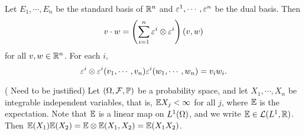 \begin{example}
    Let $E_1, \cdots, E_n$ be the standard basis of $\mathbb{R}^n$ and $\varepsilon^1, \cdots, \varepsilon^n$ be the dual basis. Then 
    $$ v \cdot w = \left(\sum_{i=1}^{n}\varepsilon^i \otimes \varepsilon^i\right)(v,w) $$ for all $v,w \in \mathbb{R}^n$. For each $i$, 
    $$\varepsilon^i \otimes \varepsilon^i(v_1, \cdots, v_n)\varepsilon^i(w_1,\cdots,w_n) = v_i w_i. $$
\end{example}
\begin{example}
    ({\color{blue} Need to be justified}) 
    Let $(\Omega, \mathcal{F}, \mathbb{P})$ be a probability space, and let $X_1, \cdots, X_n$ be integrable independent variables, that is, $\mathbb{E} X_j < \infty$ for all $j$, where $\mathbb{E}$ is the expectation. Note that $\mathbb{E}$ is a linear map on $L^1(\Omega)$, and we write $\mathbb{E} \in \mathcal{L}(L^1, \mathbb{R})$. Then $\mathbb{E}(X_1)\mathbb{E}(X_2) = \mathbb{E} \otimes \mathbb{E}(X_1, X_2) = \mathbb{E}(X_1 X_2)$. 
\end{example}


